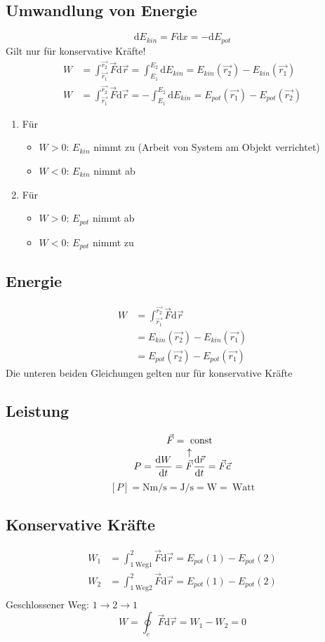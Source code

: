 \documentclass[a4paper]{scrartcl}
\renewcommand{\d}{\mathrm{d}}
\renewcommand{\v}[1]{\vec{#1}}
\begin{document}
\subsection{Umwandlung von Energie}
\label{sec-9-5}
\[\d E_{kin} = F\d x = -\d E_{pot}\]
Gilt nur für konservative Kräfte!
\begin{align}
W &= \int_{\v{r_1}}^{\v{r_2}} \v F\d \v r = \int_{E_1}^{E_2} \d E_{kin} = E_{kin}(\v{r_2}) - E_{kin}(\v{r_1}) \\
W &= \int_{\v{r_1}}^{\v{r_2}} \v F\d \v r = -\int_{E_1}^{E_2} \d E_{kin} = E_{pot}(\v{r_1}) - E_{pot}(\v{r_2})
\end{align}
\begin{enumerate}
\item Für
\begin{itemize}
\item $W > 0$: $E_{kin}$ nimmt zu (Arbeit von System am Objekt verrichtet)
\item $W < 0$: $E_{kin}$ nimmt ab
\end{itemize}
\item Für
\begin{itemize}
\item $W > 0$: $E_{pot}$ nimmt ab
\item $W < 0$: $E_{pot}$ nimmt zu
\end{itemize}
\end{enumerate}
\subsection{Energie}
\label{sec-9-6}
\begin{align}
W &= \int_{\v{r_1}}^{\v{r_2}} \v F \d \v r \\
&= E_{kin}(\v{r_2}) - E_{kin}(\v{r_1}) \\
&= E_{pot}(\v{r_2}) - E_{pot}(\v{r_1})
\end{align}
Die unteren beiden Gleichungen gelten nur für konservative Kräfte
\subsection{Leistung}
\label{sec-9-7}
\[P = \frac{\d W}{\d t} = \overarrow[\v F]{$\v F =~\text{const}$} \frac{\d \v r}{\d t} = \v F \v c\]
\[[P] = \si{\newton\meter\per\second} = \si{\joule\per\second} = \si{\watt} = ~\text{Watt}\]
\subsection{Konservative Kräfte}
\label{sec-9-8}
\begin{align}
W_1 &= \int_{1~\text{Weg1}}^2 \v F\d \v r = E_{pot}(1) - E_{pot}(2) \\
W_2 &= \int_{1~\text{Weg2}}^2 \v F\d \v r = E_{pot}(1) - E_{pot}(2) \\
\end{align}
Geschlossener Weg: $1\to 2\to 1$
\[W=\oint_c \v F\d \v r = W_1 - W_2 = 0\]
\end{document}
